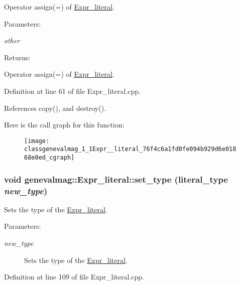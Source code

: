 Operator assign(=) of \hyperlink{classgenevalmag_1_1Expr__literal}{Expr\_\-literal}. \begin{Desc}
\item[Parameters:]
\begin{description}
\item[{\em other}]\end{description}
\end{Desc}
\begin{Desc}
\item[Returns:]\end{Desc}
Operator assign(=) of \hyperlink{classgenevalmag_1_1Expr__literal}{Expr\_\-literal}. 

Definition at line 61 of file Expr\_\-literal.cpp.

References copy(), and destroy().

Here is the call graph for this function:\nopagebreak
\begin{figure}[H]
\begin{center}
\leavevmode
\texttt{[image: classgenevalmag\_1\_1Expr\_\_literal\_76f4c6a1fd0fe094b929d6e01868e0ed\_cgraph]}
\end{center}
\end{figure}
\hypertarget{classgenevalmag_1_1Expr__literal_6a09dcb9f4c693c55b30ead8b70477fe}{
\subsubsection[{set\_\-type}]{\setlength{\rightskip}{0pt plus 5cm}void genevalmag::Expr\_\-literal::set\_\-type ({\bf literal\_\-type} {\em new\_\-type})}}
\label{classgenevalmag_1_1Expr__literal_6a09dcb9f4c693c55b30ead8b70477fe}


Sets the type of the \hyperlink{classgenevalmag_1_1Expr__literal}{Expr\_\-literal}. \begin{Desc}
\item[Parameters:]
\begin{description}
\item[{\em new\_\-type}]Sets the type of the \hyperlink{classgenevalmag_1_1Expr__literal}{Expr\_\-literal}. \end{description}
\end{Desc}


Definition at line 109 of file Expr\_\-literal.cpp.

